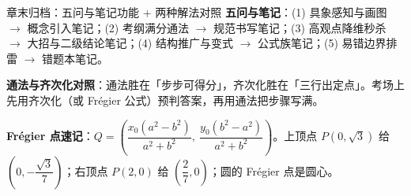 \begin{notezone}{章末归档：五问与笔记功能 + 两种解法对照}
\textbf{五问与笔记}：(1) 具象感知与画图 $\to$ 概念引入笔记；(2) 考纲满分通法 $\to$ 规范书写笔记；(3) 高观点降维秒杀 $\to$ 大招与二级结论笔记；(4) 结构推广与变式 $\to$ 公式族笔记；(5) 易错边界排雷 $\to$ 错题本笔记。

\textbf{通法与齐次化对照}：通法胜在「步步可得分」，齐次化胜在「三行出定点」。考场上先用齐次化（或 Frégier 公式）预判答案，再用通法把步骤写满。

\textbf{Frégier 点速记}：$Q=\left(\dfrac{x_0(a^2-b^2)}{a^2+b^2},\ \dfrac{y_0(b^2-a^2)}{a^2+b^2}\right)$。上顶点 $P(0,\sqrt3)$ 给 $\left(0,-\dfrac{\sqrt3}{7}\right)$；右顶点 $P(2,0)$ 给 $\left(\dfrac27,0\right)$；圆的 Frégier 点是圆心。
\end{notezone}
